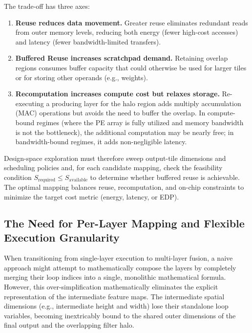 The trade-off has three axes:

\begin{enumerate}
  \item \textbf{Reuse reduces data movement.}
        Greater reuse eliminates redundant reads from outer memory
        levels, reducing both energy (fewer high-cost accesses) and
        latency (fewer bandwidth-limited transfers).

  \item \textbf{Buffered Reuse increases scratchpad demand.}
        Retaining overlap regions consumes buffer capacity that could
        otherwise be used for larger tiles or for storing other
        operands (e.g., weights).

  \item \textbf{Recomputation increases compute cost but relaxes
        storage.}
        Re-executing a producing layer for the halo region adds  multiply accumulation (MAC)
        operations but avoids the need to buffer the overlap.
        In compute-bound regimes (where the PE array is fully
        utilized and memory bandwidth is not the bottleneck), the
        additional computation may be nearly free; in
        bandwidth-bound regimes, it adds non-negligible latency.
\end{enumerate}

Design-space exploration must therefore sweep output-tile dimensions
and scheduling policies and, for each candidate mapping, check the
feasibility condition $S_{\text{required}} \le S_{\text{available}}$
to determine whether buffered reuse is achievable.
The optimal mapping balances reuse, recomputation, and on-chip
constraints to minimize the target cost metric (energy, latency, or
EDP).

\subsection{The Need for Per-Layer Mapping and Flexible Execution Granularity}
\label{sec:fds-per-layer-mapping}

When transitioning from single-layer execution to multi-layer fusion, a naive approach might attempt to mathematically compose the layers by completely merging their loop indices into a single, monolithic mathematical formula. However, this over-simplification mathematically eliminates the explicit representation of the intermediate feature maps. The intermediate spatial dimensions (e.g., intermediate height and width) lose their standalone loop variables, becoming inextricably bound to the shared outer dimensions of the final output and the overlapping filter halo. 

